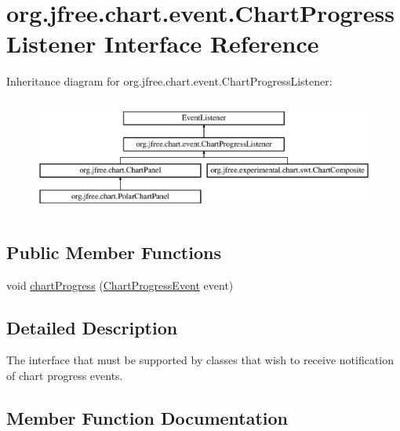 \hypertarget{interfaceorg_1_1jfree_1_1chart_1_1event_1_1_chart_progress_listener}{}\section{org.\+jfree.\+chart.\+event.\+Chart\+Progress\+Listener Interface Reference}
\label{interfaceorg_1_1jfree_1_1chart_1_1event_1_1_chart_progress_listener}
Inheritance diagram for org.\+jfree.\+chart.\+event.\+Chart\+Progress\+Listener\+:\begin{figure}[H]
\begin{center}
\leavevmode
\includegraphics[height=3.835616cm]{interfaceorg_1_1jfree_1_1chart_1_1event_1_1_chart_progress_listener}
\end{center}
\end{figure}
\subsection*{Public Member Functions}
\begin{DoxyCompactItemize}
\item 
void \mbox{\hyperlink{interfaceorg_1_1jfree_1_1chart_1_1event_1_1_chart_progress_listener_ac76c2d68a45af7a6a97aaf9998259eab}{chart\+Progress}} (\mbox{\hyperlink{classorg_1_1jfree_1_1chart_1_1event_1_1_chart_progress_event}{Chart\+Progress\+Event}} event)
\end{DoxyCompactItemize}


\subsection{Detailed Description}
The interface that must be supported by classes that wish to receive notification of chart progress events. 

\subsection{Member Function Documentation}
\mbox{\label{interfaceorg_1_1jfree_1_1chart_1_1event_1_1_chart_progress_listener_ac76c2d68a45af7a6a97aaf9998259eab}} 
